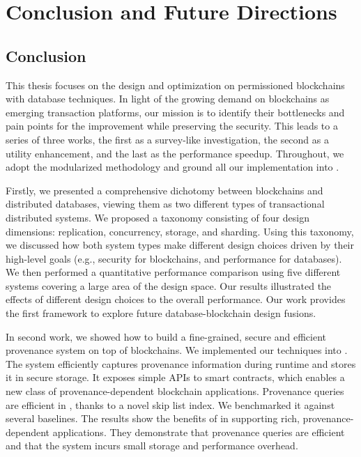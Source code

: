 
\chapter{Conclusion and Future Directions}
\label{ch:conclu}
\section{Conclusion}
This thesis focuses on the design and optimization on permissioned blockchains with database techniques. 
In light of the growing demand on blockchains as emerging transaction platforms, 
our mission is to identify their bottlenecks and pain points for the improvement while preserving the security.
This leads to a series of three works, the first as a survey-like investigation, the second as a utility enhancement, and the last as the performance speedup. 
Throughout, we adopt the modularized methodology and ground all our implementation into {\fs}. 

Firstly, we presented a comprehensive dichotomy between blockchains and distributed databases, viewing them as two different types of transactional distributed systems. We proposed a taxonomy consisting of four design dimensions: replication, concurrency, storage, and sharding. Using this taxonomy, we discussed how both system types make different design choices driven by their high-level goals (e.g., security for blockchains, and performance for databases). We then performed a quantitative performance comparison using five different systems covering a large area of the design space. Our results illustrated the effects of different design choices to the overall performance. Our work provides the first framework to explore future database-blockchain design fusions. 

In second work, we showed how to build a fine-grained,
secure and efficient provenance system on top of blockchains. 
We implemented our techniques into {\fs}.
The system efficiently captures provenance information during runtime and stores it in secure storage. 
It exposes simple APIs to smart contracts, which enables a new class of provenance-dependent blockchain applications. 
Provenance queries are efficient in {\fs}, thanks to a novel skip
list index. We benchmarked it against several baselines. The results show the benefits of {\fs} in supporting rich,
provenance-dependent applications. They demonstrate that
provenance queries are efficient and that the system incurs
small storage and performance overhead.

